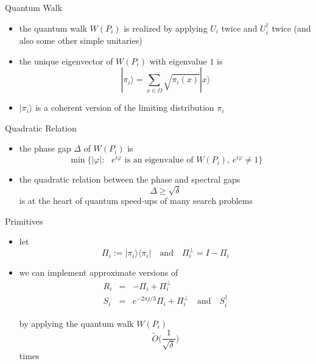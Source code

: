 \documentclass[slideColor]{prosper}
\renewcommand{\>}{\rangle}
\newcommand{\<}{\langle}
\begin{document}

\begin{slide}{Quantum Walk}
\begin{itemize}
\item the quantum walk $W(P_i)$ is realized by applying $U_i$ twice and $U_i^\dagger$ twice (and also some other simple unitaries)

\bigskip
\item the unique eigenvector of $W(P_i)$ with eigenvalue $1$ is
\[
|\pi_i\> = \sum_{x\in\Omega} \sqrt{\pi_i(x)} |x\>
\]

\item
$|\pi_i\>$ is a coherent version of the limiting distribution $\pi_i$
\end{itemize}
\end{slide}


\begin{slide}{Quadratic Relation}
\begin{itemize}
\item the phase gap $\Delta$ of $W(P_i)$ is
\[
\min\{ |\varphi| : \mbox{ $e^{i\varphi}$ is an eigenvalue of $W(P_i)$, $e^{i\varphi}\neq 1$} \} 
\]

\medskip
\item the quadratic relation between the phase and spectral gaps
\[
\Delta \ge \sqrt{\delta}
\]
is at the heart of quantum speed-ups of many search problems
\end{itemize}
\end{slide}


\begin{slide}{Primitives}
\begin{itemize}
\item let
\[
\Pi_i := |\pi_i\>\<\pi_i| \quad \mbox{and} \quad \Pi_i^\perp = I - \Pi_i
\]

\medskip
\item we can implement approximate versions of 
\begin{eqnarray*}
R_i         & = & - \Pi_i             + \Pi_i^\perp \\
S_i         & = & e^{-2\pi j/3} \Pi_i + \Pi_i^\perp \quad \mbox{and} \quad S_i^\dagger 
\end{eqnarray*}

\medskip
by applying the quantum walk $W(P_i)$
\[
\tilde{O}\Big(
\frac{1}{\sqrt{\delta}}
\Big)
\]
times
\end{itemize}
\end{slide}
\end{document}
